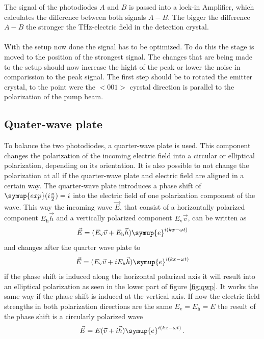 The signal of the photodiodes $A$ and $B$ is passed into a lock-in Amplifier, which calculates the difference between both signals $A-B$.
The bigger the difference $A-B$ the stronger the $\si{\tera\hertz}$-electric field in the detection crystal.
\\\\
With the setup now done the signal has to be optimized.
To do this the stage is moved to the position of the strongest signal.
The changes that are being made to the setup should now increase the hight of the peak or lower the noise in comparission to the peak signal.
The first step should be to rotated the emitter crystal, to the point were the $<001>$ cyrstal direction is parallel to the polarization of the pump beam. 
\FloatBarrier
\subsection{Quater-wave plate}
\label{sec:qwp}
To balance the two photodiodes, a quarter-wave plate is used.
This component changes the polarization of the incoming electric field into a circular or elliptical polarization, depending on its orientation.
It is also possible to not change the polarization at all if the quarter-wave plate and electric field are aligned in a certain way.
The quarter-wave plate introduces a phase shift of $\symup{exp}(i\frac{\pi}{2}) = i$ into the electric field of one polarization component of the wave.
This way the incoming wave $\vec{E}$, that consist of a horizontally polarized component $E_\text{h}\vec{h}$ and a vertically polarized component $E_\text{v}\vec{v}$, can be written as
\begin{equation}
    \vec{E} = (E_\text{v}\vec{v} + E_\text{h}\vec{h})\symup{e}^{i(kx-\omega t)}
\end{equation}
and changes after the quarter wave plate to 
\begin{equation}
    \vec{E} = (E_\text{v}\vec{v} + i E_\text{h}\vec{h})\symup{e}^{i(kx-\omega t)}
\end{equation}
if the phase shift is induced along the horizontal polarized axis it will result into an elliptical polarization as seen in the lower part of figure \ref{fig:qwp}.
It works the same way if the phase shift is induced at the vertical axis.
If now the electric field strengths in both polarization directions are the same $E_\text{v} = E_\text{h} = E$ the result of the phase shift is a circularly polarized wave
\begin{equation}
    \vec{E} = E(\vec{v} + i\vec{h})\symup{e}^{i(kx-\omega t)} \, .
\end{equation}
